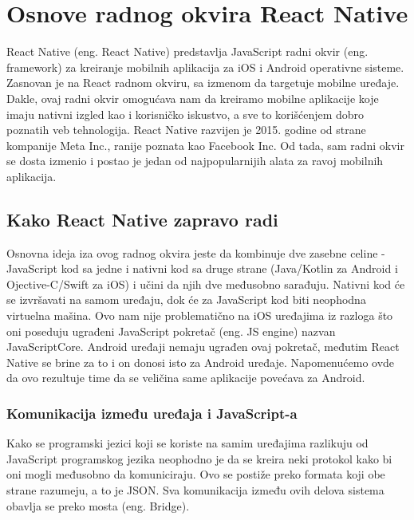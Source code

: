 \documentclass[12pt,oneside]{memoir}
\begin{document}
\chapter{Osnove radnog okvira React Native}

React Native\cite[22]{reactNative} (eng. React Native) predstavlja JavaScript radni okvir (eng. framework) za kreiranje mobilnih aplikacija za iOS i Android operativne sisteme. Zasnovan je na React radnom okviru, sa izmenom da targetuje mobilne uređaje. Dakle, ovaj radni okvir omogućava nam da kreiramo mobilne aplikacije koje imaju nativni izgled kao i korisničko iskustvo, a sve to korišćenjem dobro poznatih veb tehnologija. React Native razvijen je 2015. godine od strane kompanije Meta Inc., ranije poznata kao Facebook Inc. Od tada, sam radni okvir se dosta izmenio i postao je jedan od najpopularnijih alata za ravoj mobilnih aplikacija.

\section{Kako React Native zapravo radi}

Osnovna ideja iza ovog radnog okvira jeste da kombinuje dve zasebne celine - JavaScript kod sa jedne i nativni kod sa druge strane (Java/Kotlin za Android \cite{javaVsKotlin} i Ojective-C/Swift za iOS\cite{swiftVsObjectiveC}) i učini da njih dve međusobno sarađuju. Nativni kod će se izvršavati na samom uređaju, dok će za JavaScript kod biti neophodna virtuelna mašina. Ovo nam nije problematično na iOS uređajima iz razloga što oni poseduju ugrađeni JavaScript pokretač (eng. JS engine) nazvan JavaScriptCore\cite{JSCore}. Android uređaji nemaju ugrađen ovaj pokretač, međutim React Native se brine za to i on donosi isto za Android uređaje. Napomenućemo ovde da ovo rezultuje time da se veličina same aplikacije povećava za Android.

\subsection{Komunikacija između uređaja i JavaScript-a}

Kako se programski jezici koji se koriste na samim uređajima razlikuju od JavaScript programskog jezika neophodno je da se kreira neki protokol kako bi oni mogli međusobno da komuniciraju. Ovo se postiže preko formata koji obe strane razumeju, a to je JSON\cite{JSON}. Sva komunikacija između ovih delova sistema obavlja se preko mosta (eng. Bridge).
\end{document}
